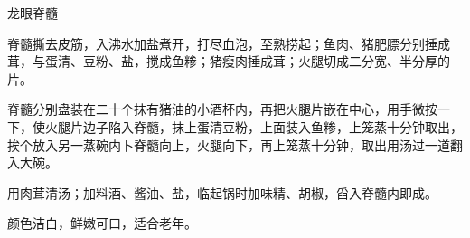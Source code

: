 \begin{recipe}{龙眼脊髓}

\ingredients


\cooking

\step 脊髓撕去皮筋，入沸水加盐煮开，打尽血泡，至熟捞起；鱼肉、猪肥膘分别捶成茸，与蛋清、豆粉、盐，搅成鱼糁；猪瘦肉捶成茸；火腿切成二分宽、半分厚的片。

\step 脊髓分别盘装在二十个抹有猪油的小酒杯内，再把火腿片嵌在中心，用手微按一下，使火腿片边子陷入脊髓，抹上蛋清豆粉，上面装入鱼糁，上笼蒸十分钟取出，挨个放入另一蒸碗内卜脊髓向上，火腿向下，再上笼蒸十分钟，取出用汤过一道翻入大碗。

\step 用肉茸清汤；加料酒、酱油、盐，临起锅时加味精、胡椒，舀入脊髓内即成。

\notes

颜色洁白，鲜嫩可口，适合老年。

\end{recipe}

